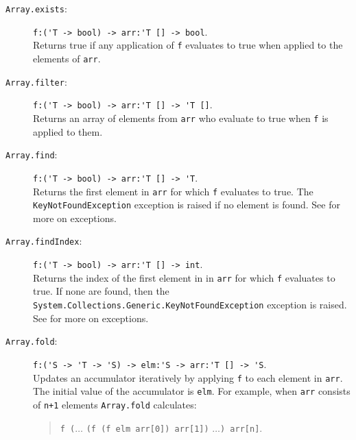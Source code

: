 \documentclass[fsharpNotes.tex]{subfiles}
\begin{document}
\begin{description}
\item[\texttt{Array.exists}:] \lstinline{f:('T -> bool) -> arr:'T [] -> bool}.~\\
  Returns true if any application of \lstinline{f} evaluates to true when applied to the elements of \lstinline{arr}.
\item[\texttt{Array.filter}:] \lstinline{f:('T -> bool) -> arr:'T [] -> 'T []}.~\\
  Returns an array of elements from \lstinline{arr} who evaluate to true when \lstinline{f} is applied to them.
\item[\texttt{Array.find}:] \lstinline{f:('T -> bool) -> arr:'T [] -> 'T}.~\\
  Returns the first element in \lstinline{arr} for which \lstinline{f} evaluates to true. The \lstinline{KeyNotFoundException} exception is raised if no element is found.  See  for more on exceptions.
    
\item[\texttt{Array.findIndex}:] \lstinline{f:('T -> bool) -> arr:'T [] -> int}.~\\
  Returns the index of the first element in in \lstinline{arr} for which \lstinline{f} evaluates to true. If none are found, then the \lstinline{System.Collections.Generic.KeyNotFoundException} exception is raised.  See  for more on exceptions.
\item[\texttt{Array.fold}:] \lstinline{f:('S -> 'T -> 'S) -> elm:'S -> arr:'T [] -> 'S}.~\\
  Updates an accumulator iteratively by applying \lstinline{f} to each element in \lstinline{arr}. The initial value of the accumulator is \lstinline{elm}. For example, when \lstinline{arr} consists of \lstinline{n+1} elements
  \lstinline{Array.fold} calculates:
  \begin{quote}
    \lstinline{f (}$\ldots$ \lstinline{(f (f elm arr[0]) arr[1])} $\ldots$\lstinline{) arr[n]}.

\end{quote}
\end{description}
\end{document}
